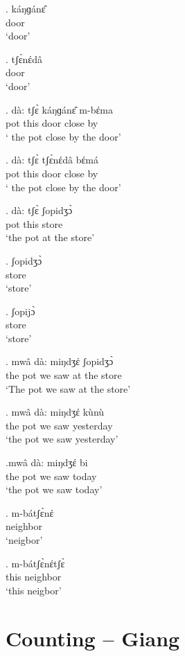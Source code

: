 \documentclass{assets/fieldnotes}
\begin{document}
\exg. káŋɡánɛ̂\\
door\\
`door'

\exg. tʃɛ̀nέdâ\\
door\\
`door'

\exg. dà: tʃɛ̀ káŋɡánɛ̂ m-bέma\\
 pot this door close by  \\
` the pot close by the door'

\exg. dà: tʃɛ̀ tʃɛ̀nέdâ bέmá\\
 pot this door close by \\
` the pot close by the door'

\exg. dà: tʃɛ̀  ʃopidʒɔ̀ \\
 pot this store\\
`the pot at the store'


\exg. ʃopidʒɔ̀\\
store\\
`store'

\exg. ʃopijɔ̀\\
store\\
`store'

\exg. mwâ dà: miŋdʒέ ʃopidʒɔ̀\\ 
the pot we saw at the store\\ %
`The pot we saw at the store'

\exg. mwâ dà: miŋdʒέ kùnù\\
the pot we saw yesterday\\
`the pot we saw yesterday'

\exg.mwâ dà: miŋdʒέ bi\\
the pot we saw today\\
`the pot we saw today'

\exg. m-bátʃɛ̀nέ\\
neighbor\\
 `neigbor'
 
\exg. m-bátʃɛ̀nέtʃɛ̀\\
this neighbor\\
 `this neigbor'

 

\section{Counting -- Giang} 
\end{document}
